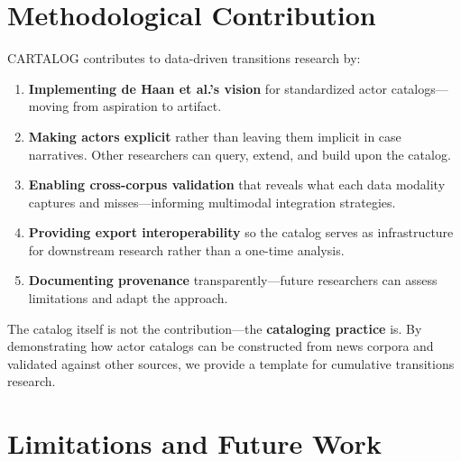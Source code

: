 \documentclass[../main.tex]{subfiles}
\begin{document}
\section{Methodological Contribution}

\begin{summarybox}
\textsc{CARTALOG} contributes to data-driven transitions research by:

\begin{enumerate}[leftmargin=*, itemsep=0.3em]
\item \textbf{Implementing de Haan et al.'s vision} for standardized actor catalogs---moving from aspiration to artifact.

\item \textbf{Making actors explicit} rather than leaving them implicit in case narratives. Other researchers can query, extend, and build upon the catalog.

\item \textbf{Enabling cross-corpus validation} that reveals what each data modality captures and misses---informing multimodal integration strategies.

\item \textbf{Providing export interoperability} so the catalog serves as infrastructure for downstream research rather than a one-time analysis.

\item \textbf{Documenting provenance} transparently---future researchers can assess limitations and adapt the approach.
\end{enumerate}

The catalog itself is not the contribution---the \textbf{cataloging practice} is. By demonstrating how actor catalogs can be constructed from news corpora and validated against other sources, we provide a template for cumulative transitions research.
\end{summarybox}


\section{Limitations and Future Work}
\end{document}
